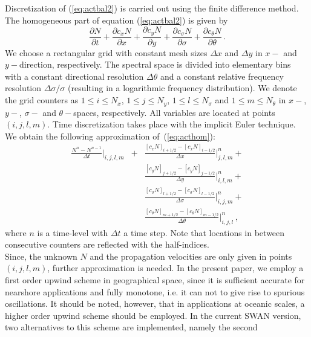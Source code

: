 \documentclass[12pt]{book}
\begin{document}
Discretization of (\ref{eq:actbal2}) is carried out using the finite difference method.
The homogeneous part of equation (\ref{eq:actbal2}) is given by
\begin{equation}
  \frac{\partial N}{\partial t} +
  \frac{\partial c_x N}{\partial x} +
  \frac{\partial c_y N}{\partial y} +
  \frac{\partial c_\sigma N}{\partial \sigma} +
  \frac{\partial c_\theta N}{\partial \theta}\, .
  \label{eq:acthom}
\end{equation}
We choose a rectangular grid with constant mesh sizes $\Delta x$ and $\Delta y$ in $x-$ and $y-$direction,
respectively. The spectral space is divided into elementary bins with a constant directional
resolution $\Delta \theta$ and a constant relative frequency resolution $\Delta \sigma/\sigma$
(resulting in a logarithmic frequency distribution). We denote the grid counters as $1 \leq i \leq N_x$,
$1 \leq j \leq N_y$, $1 \leq l \leq N_{\sigma}$ and $1 \leq m \leq N_{\theta}$ in $x-$, $y-$, $\sigma-$
and $\theta-$spaces, respectively. All variables are located at points $(i,j,l,m)$. Time discretization
takes place with the implicit Euler technique. We obtain the following approximation of~(\ref{eq:acthom}):
\begin{eqnarray}
    \frac{N^{n}-N^{n-1}}{\Delta t}|_{i,j,l,m} &+&
    \frac{[c_x N]_{i+1/2}-[c_x N]_{i-1/2}}{\Delta x}|^{n}_{j,l,m} + \nonumber \\
  &&\frac{[c_y N]_{j+1/2}-[c_y N]_{j-1/2}}{\Delta y}|^{n}_{i,l,m} + \nonumber \\
  &&\frac{[c_\sigma N]_{l+1/2}-[c_\sigma N]_{l-1/2}}{\Delta \sigma}|^{n}_{i,j,m} + \nonumber \\
  &&\frac{[c_\theta N]_{m+1/2}-[c_\theta N]_{m-1/2}}{\Delta \theta}|^{n}_{i,j,l}\, ,
  \label{eq:actdisc}
\end{eqnarray}
where $n$ is a time-level with $\Delta t$ a time step. Note that locations in between consecutive
counters are reflected with the half-indices.
\\[2ex]
\noindent
Since, the unknown $N$ and the propagation velocities are only given in points $(i,j,l,m)$,
further approximation is needed. In the present paper, we employ a first order upwind scheme
in geographical space, since it is sufficient accurate for nearshore applications and fully
monotone, i.e. it can not to give rise to spurious oscillations. It should be noted, however,
that in applications at oceanic scales, a higher order upwind scheme should be employed. In
the current SWAN version, two alternatives to this scheme are implemented, namely the second
\end{document}
